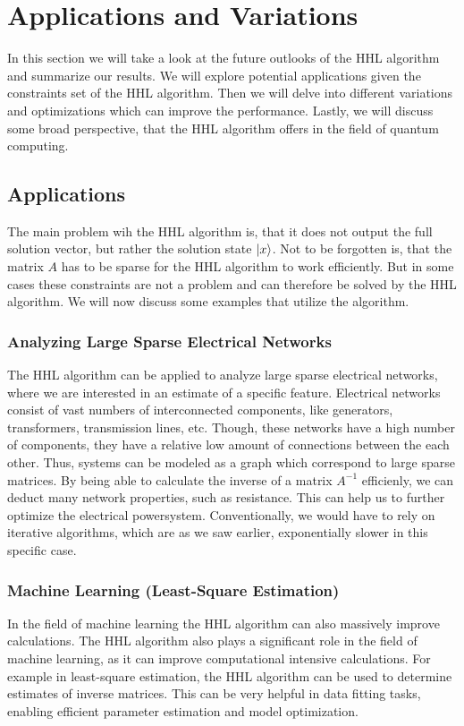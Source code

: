 \section{Applications and Variations} 
In this section we will take a look at the future outlooks of the HHL algorithm and summarize our results.
We will explore potential applications given the constraints set of the HHL algorithm.
Then we will delve into different variations and optimizations which can improve the performance. 
Lastly, we will discuss some broad perspective, that the HHL algorithm offers in the field of quantum computing. 

\subsection{Applications}
The main problem wih the HHL algorithm is, that it does not output the full solution vector, but rather the solution state $\ket x$.
Not to be forgotten is, that the matrix $A$ has to be sparse for the HHL algorithm to work efficiently.
But in some cases these constraints are not a problem and can therefore be solved by the HHL algorithm.
We will now discuss some examples that utilize the algorithm. 

    \subsubsection{Analyzing Large Sparse Electrical Networks}
    The HHL algorithm can be applied to analyze large sparse electrical networks, where we are interested in an estimate of a specific feature.
    Electrical networks consist of vast numbers of interconnected components, like generators, transformers, transmission lines, etc. 
    Though, these networks have a high number of components, they have a relative low amount of connections between the each other.
    Thus, systems can be modeled as a graph which correspond to large sparse matrices.
    By being able to calculate the inverse of a matrix $A^{-1}$ efficienly, we can deduct many network properties, such as resistance. 
    This can help us to further optimize the electrical powersystem.
    Conventionally, we would have to rely on iterative algorithms, which are as we saw earlier, exponentially slower in this specific case.
    
    \subsubsection{Machine Learning (Least-Square Estimation)}
    In the field of machine learning the HHL algorithm can also massively improve calculations. 
    The HHL algorithm also plays a significant role in the field of machine learning, as it can improve computational intensive calculations.
    For example in least-square estimation, the HHL algorithm can be used to determine estimates of inverse matrices. 
    This can be very helpful in data fitting tasks, enabling efficient parameter estimation and model optimization.
    
